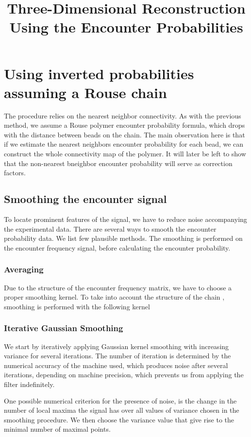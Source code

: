 \documentclass[12pt]{article}
\title{Three-Dimensional Reconstruction Using the Encounter Probabilities}
\begin{document}
\maketitle

\section{Using inverted probabilities assuming a Rouse chain}
The procedure relies on the nearest neighbor connectivity. As with the previous method, we assume a Rouse polymer encounter probability formula, which drops with the distance between beads on the chain. The main observation here is that if we estimate the nearest neighbors encounter probability for each bead, we can construct the whole connectivity map of the polymer. It will later be left to show that the non-nearest bneighbor encounter probability will serve as correction factors.

\subsection{Smoothing the encounter signal}
To locate prominent features of the signal, we have to reduce noise accompanying the experimental data. There are several ways to smooth the encounter probability data. We list few plausible methods.
The smoothing is performed on the encounter frequency signal, before calculating the encounter probability. 

\subsubsection{Averaging}
Due to the structure of the encounter frequency matrix, we have to choose a proper smoothing kernel. To take into account the structure of the chain , smoothing is performed with the following kernel 


\subsubsection{Iterative Gaussian Smoothing}
We start by iteratively applying Gaussian kernel smoothing with increasing variance for several iterations. The number of iteration is determined by the numerical accuracy of the machine used, which produces noise after several iterations, depending on machine precision, which prevents us from applying the filter indefinitely. 

One possible numerical criterion for the presence of noise, is the change in the number of local maxima the signal has over all values of variance chosen in the smoothing procedure. We then choose the variance value that give rise to the minimal number of maximal points. 
\end{document}
